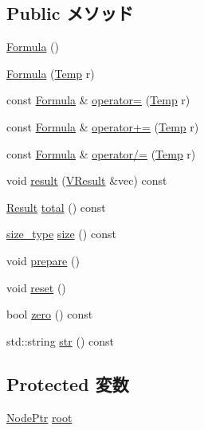 \subsection*{Public メソッド}
\begin{DoxyCompactItemize}
\item 
\hyperlink{classStats_1_1Formula_a3b99b8902a1d298951025096a0537dd8}{Formula} ()
\item 
\hyperlink{classStats_1_1Formula_aa382261a63758affb764f96c7281436e}{Formula} (\hyperlink{classStats_1_1Temp}{Temp} r)
\item 
const \hyperlink{classStats_1_1Formula}{Formula} \& \hyperlink{classStats_1_1Formula_a1b436830b3390f8a71ca2f460ef3e5b7}{operator=} (\hyperlink{classStats_1_1Temp}{Temp} r)
\item 
const \hyperlink{classStats_1_1Formula}{Formula} \& \hyperlink{classStats_1_1Formula_a42c7af4fd136e07033823e9965715d7b}{operator+=} (\hyperlink{classStats_1_1Temp}{Temp} r)
\item 
const \hyperlink{classStats_1_1Formula}{Formula} \& \hyperlink{classStats_1_1Formula_a90b02014636934b23364214dcceff3c4}{operator/=} (\hyperlink{classStats_1_1Temp}{Temp} r)
\item 
void \hyperlink{classStats_1_1Formula_a9dff2394cecff3afb2bf8662c9c9bc04}{result} (\hyperlink{classstd_1_1vector}{VResult} \&vec) const 
\item 
\hyperlink{namespaceStats_ad874d2cfd4b4a29ebd480bb2e67f20ae}{Result} \hyperlink{classStats_1_1Formula_a35c6e2ed3fc81b40d69052a062113ead}{total} () const 
\item 
\hyperlink{namespaceStats_ada51e68d31936547d3729c82daf6b7c6}{size\_\-type} \hyperlink{classStats_1_1Formula_a503ab01f6c0142145d3434f6924714e7}{size} () const 
\item 
void \hyperlink{classStats_1_1Formula_a1825b40ca3bc3a1ba67fdb58fac5015c}{prepare} ()
\item 
void \hyperlink{classStats_1_1Formula_ad20897c5c8bd47f5d4005989bead0e55}{reset} ()
\item 
bool \hyperlink{classStats_1_1Formula_a4e72b01b727d3165e75cba84eb507491}{zero} () const 
\item 
std::string \hyperlink{classStats_1_1Formula_a0bd251dfecae718a4c1568eb3d660697}{str} () const 
\end{DoxyCompactItemize}
\subsection*{Protected 変数}
\begin{DoxyCompactItemize}
\item 
\hyperlink{classRefCountingPtr}{NodePtr} \hyperlink{classStats_1_1Formula_a9d644ae9def8b6b8b9df1adf4955671d}{root}
\end{DoxyCompactItemize}
